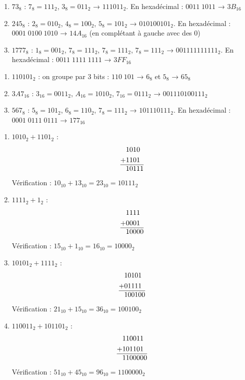 \begin{enumerate}
    \item $73_8$ : $7_8=111_2$, $3_8=011_2$ → $111011_2$. En hexadécimal : $0011\;1011$ → $3B_{16}$
    \item $245_8$ : $2_8=010_2$, $4_8=100_2$, $5_8=101_2$ → $010100101_2$. En hexadécimal : $0001\;0100\;1010$ → $14A_{16}$ (en complétant à gauche avec des 0)
    \item $1777_8$ : $1_8=001_2$, $7_8=111_2$, $7_8=111_2$, $7_8=111_2$ → $001111111111_2$. En hexadécimal : $0011\;1111\;1111$ → $3FF_{16}$
\end{enumerate}

\begin{enumerate}
    \item $110101_2$ : on groupe par 3 bits : $110\;101$ → $6_8$ et $5_8$ → $65_8$
    \item $3A7_{16}$ : $3_{16}=0011_2$, $A_{16}=1010_2$, $7_{16}=0111_2$ → $001110100111_2$
    \item $567_8$ : $5_8=101_2$, $6_8=110_2$, $7_8=111_2$ → $101110111_2$. En hexadécimal : $0001\;0111\;0111$ → $177_{16}$
\end{enumerate}

\begin{enumerate}
    \item $1010_2 + 1101_2$ :
    \begin{align*}
        &1010\\
        +&1101\\
        \hline
        &10111
    \end{align*}
    Vérification : $10_{10} + 13_{10} = 23_{10} = 10111_2$
    
    \item $1111_2 + 1_2$ :
    \begin{align*}
        &1111\\
        +&0001\\
        \hline
        &10000
    \end{align*}
    Vérification : $15_{10} + 1_{10} = 16_{10} = 10000_2$
    
    \item $10101_2 + 1111_2$ :
    \begin{align*}
        &10101\\
        +&01111\\
        \hline
        &100100
    \end{align*}
    Vérification : $21_{10} + 15_{10} = 36_{10} = 100100_2$
    
    \item $110011_2 + 101101_2$ :
    \begin{align*}
        &110011\\
        +&101101\\
        \hline
        &1100000
    \end{align*}
    Vérification : $51_{10} + 45_{10} = 96_{10} = 1100000_2$
\end{enumerate}

